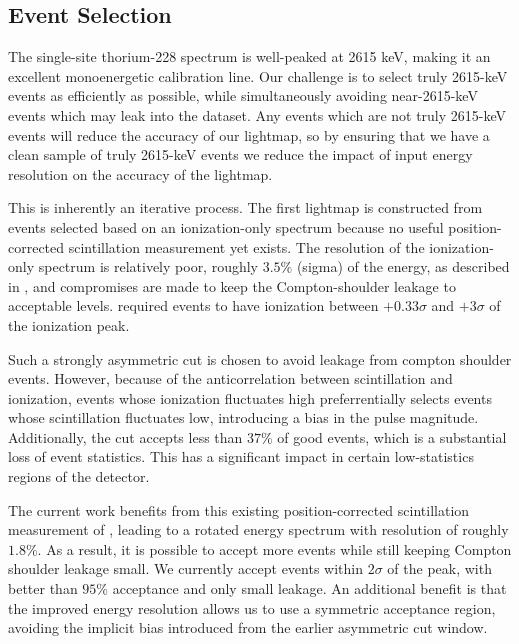 \subsection{Event Selection}\label{sec:LightmapEventSelection}

The single-site thorium-228 spectrum is well-peaked at 2615 keV, making it an excellent monoenergetic calibration line.  Our challenge is to select truly 2615-keV events as efficiently as possible, while simultaneously avoiding near-2615-keV events which may leak into the dataset.  Any events which are not truly 2615-keV events will reduce the accuracy of our lightmap, so by ensuring that we have a clean sample of truly 2615-keV events we reduce the impact of input energy resolution on the accuracy of the lightmap.

This is inherently an iterative process.  The first lightmap is constructed from events selected based on an ionization-only spectrum because no useful position-corrected scintillation measurement yet exists. The resolution of the ionization-only spectrum is relatively poor, roughly $3.5\%$ (sigma) of the energy, as described in \cite{ThesisSteve}, and compromises are made to keep the Compton-shoulder leakage to acceptable levels.  \cite{ThesisSteve} required events to have ionization between $+0.33\sigma$ and $+3\sigma$ of the ionization peak.

Such a strongly asymmetric cut is chosen to avoid leakage from compton shoulder events.  However, because of the anticorrelation between scintillation and ionization, events whose ionization fluctuates high preferrentially selects events whose scintillation fluctuates low, introducing a bias in the pulse magnitude.  Additionally, the cut accepts less than $37\%$ of good events, which is a substantial loss of event statistics. This has a significant impact in certain low-statistics regions of the detector.

The current work benefits from this existing position-corrected scintillation measurement of \cite{ThesisSteve}, leading to a rotated energy spectrum with resolution of roughly $1.8\%$.  As a result, it is possible to accept more events while still keeping Compton shoulder leakage small.  We currently accept events within $2\sigma$ of the peak, with better than $95\%$ acceptance and only small leakage.  An additional benefit is that the improved energy resolution allows us to use a symmetric acceptance region, avoiding the implicit bias introduced from the earlier asymmetric cut window.


